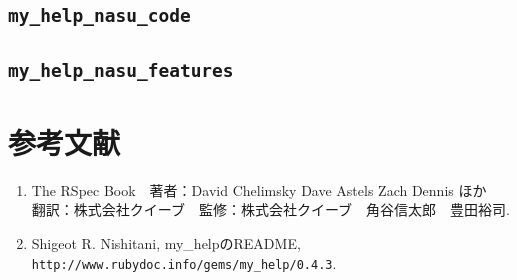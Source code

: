 \subsection{\verb|my_help_nasu_code|}
\subsection{\verb|my_help_nasu_features|}
\section{参考文献}
\begin{enumerate}
\item The RSpec Book　著者：David Chelimsky Dave Astels Zach Dennis ほか　翻訳：株式会社クイーブ　監修：株式会社クイーブ　角谷信太郎　豊田裕司.
\item Shigeot R. Nishitani, my\_helpのREADME, \verb|http://www.rubydoc.info/gems/my_help/0.4.3|.
\end{enumerate}
